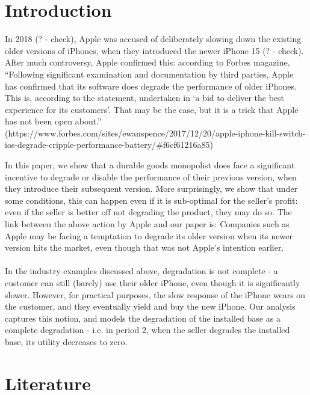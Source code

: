 \documentclass{article}
\begin{document}
\section*{Introduction}

In 2018 (? - check), Apple was accused of deliberately slowing down the existing older versions of iPhones, when they introduced the newer iPhone
15 (? - check). After much controversy, Apple confirmed this: according to Forbes magazine, {``}Following significant examination and documentation
by third parties, Apple has confirmed that its software does degrade the performance of older iPhones. This is, according to the statement, undertaken
in {`}a bid to deliver the best experience for its customers{'}. That may be the case, but it is a trick that Apple has not been open about.{''}
(https://www.forbes.com/sites/ewanspence/2017/12/20/apple-iphone-kill-switch-ios-degrade-cripple-performance-battery/$\#$f6cf61216a85) 

In this paper, we show that a durable goods monopolist does face a significant incentive to degrade or disable the performance of their previous
version, when they introduce their subsequent version. More surprisingly, we show that under some conditions, this can happen even if it is sub-optimal
for the seller{'}s profit: even if the seller is better off not degrading the product, they may do so. The link between the above action by Apple
and our paper is: Companies such as Apple may be facing a temptation to degrade its older version when its newer version hits the market, even though
that was not Apple{'}s intention earlier.\\
\\
In the industry examples discussed above, degradation is not complete - a customer can still (barely) use their older iPhone, even though it is significantly
slower. However, for practical purposes, the slow response of the iPhone wears on the customer, and they eventually yield and buy the new iPhone.
Our analysis captures this notion, and models the degradation of the installed base as a complete degradation - i.e. in period 2, when the seller
degrades the installed base, its utility decreases to zero.

\section*{Literature}
\end{document}
